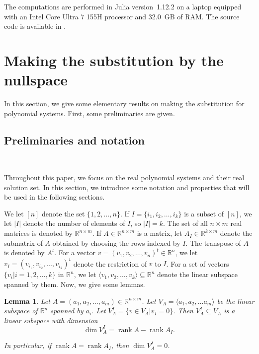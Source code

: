 \documentclass[reqno]{amsart}
\newtheorem{lemma}[theorem]{Lemma}
\theoremstyle{definition}
\numberwithin{equation}{section}
\theoremstyle{remark}
\begin{document}
The computations are performed in Julia version~1.12.2
\cite{Bez17Julia} on a laptop equipped with an Intel Core Ultra
7 155H processor and 32.0~GB of RAM. The source code is available in
\cite{L-23}.

\section{Making the substitution by the nullspace}\label{sec-subnull}

In this section, we give some elementary results on making the substitution for polynomial systems. First, some preliminaries are given.

\subsection{Preliminaries and notation}
\

Throughout this paper, we focus on the real polynomial systems and their real solution set. In this section, we introduce some notation and properties that will be used in the following sections.

We let $[n]$ denote the set $\{1,2,\ldots,n\}$. 
If $I=\{i_1,i_2,\ldots,i_k\}$ is a subset of $[n]$,  we let $|I|$ denote the number of elements of $I$, so $|I|=k$. The set of all $n\times m$ real matrices is denoted by $\mathbb{R}^{n\times m}$. If $A\in \mathbb{R}^{n\times m}$ is a matrix, let $A_I\in \mathbb{R}^{k\times m}$ denote the submatrix of $A$ obtained by choosing the rows indexed by $I$. The transpose of $A$ is denoted by $A^t$.
For a vector $v=(v_1,v_2,\ldots,v_n)^t\in \mathbb{R}^n$, we let $v_I=(v_{i_1},v_{i_2},\ldots,v_{i_k})^t$ denote the restriction of $v$ to $I$.  For a set of vectors $\{v_i|i=1,2,\ldots, k\}$ in $\mathbb{R}^n$, we let $\langle v_1, v_2,\ldots, v_k \rangle \subseteq \mathbb{R}^n$ denote the linear subspace spanned by them. Now, we give some lemmas.
\begin{lemma}\label{lem-rankaai}
Let $A=(a_1,a_2,\ldots,a_m)\in \mathbb{R}^{n\times m}$. Let $V_A=\langle a_1,a_2,\ldots a_m \rangle$ be the linear subspace of $\mathbb{R}^{n}$ spanned by $a_i$. Let $V_A^I=\{v\in V_A| v_I=0 \}$.
Then $V_A^I \subseteq V_A$ is a linear subspace with dimension
$$\dim V_A^I=\operatorname{rank}A-\operatorname{rank}A_I.$$

In particular, if $\operatorname{rank}A=\operatorname{rank}A_I$, then $\dim V_A^I=0$.
\end{lemma}
\end{document}
